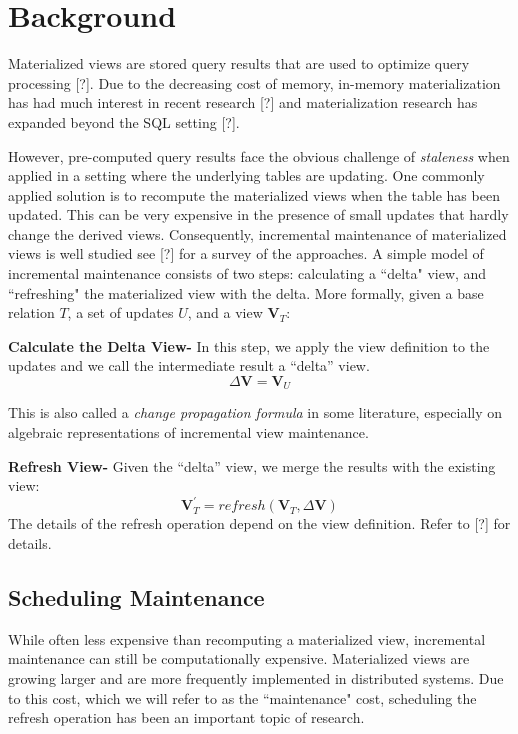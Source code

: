 \section{Background}
Materialized views are stored query results that are used 
to optimize query processing [?].
Due to the decreasing cost of memory, in-memory materialization 
has had much interest in recent research [?] and materialization 
research has expanded beyond the SQL setting [?].

However, pre-computed query results face the obvious challenge of \emph{staleness} when applied
in a setting where the underlying tables are updating.
One commonly applied solution is to recompute the materialized views when the table has been updated.
This can be very expensive in the presence of small updates that hardly change the derived views.
Consequently, incremental maintenance of materialized views is well studied see [?]
for a survey of the approaches. 
A simple model of incremental maintenance consists of two steps: calculating a ``delta" view,
and ``refreshing" the materialized view with the delta.
More formally, given a base relation $T$, a set of updates $U$,
and a view $\textbf{V}_{T}$:

\textbf{Calculate the Delta View- }
In this step, we apply the view definition to the updates and we call
the intermediate result a ``delta'' view.
\[
\Delta\textbf{V}=\textbf{V}_{U}
\]

This is also called a \emph{change propagation formula} in some literature,
especially on algebraic representations of incremental view maintenance.

\textbf{Refresh View- }
Given the ``delta'' view, we merge the results with the existing
view:
\[
\textbf{V}_{T}^{'}=refresh(\textbf{V}_{T},\Delta\textbf{V})
\] 
The details of the refresh operation depend on the view definition.
Refer to [?] for details.

\subsection{Scheduling Maintenance}
While often less expensive than recomputing a materialized view,
incremental maintenance can still be computationally expensive.
Materialized views are growing larger and are more frequently 
implemented in distributed systems.
Due to this cost, which we will refer to as the ``maintenance" cost, 
scheduling the refresh operation has been an important topic of research.

